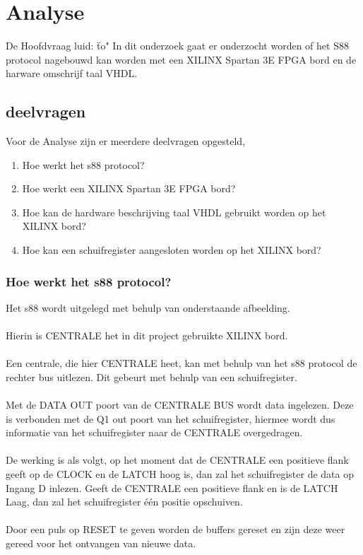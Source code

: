 \chapter{Analyse}
De Hoofdvraag luid:
\"to"
In dit onderzoek gaat er onderzocht worden of het S88 protocol nagebouwd kan worden met een XILINX Spartan 3E FPGA bord en de harware omschrijf taal VHDL.
\section{deelvragen}
Voor de Analyse zijn er meerdere deelvragen opgesteld,

\begin{enumerate}
	\item Hoe werkt het s88 protocol?
	\item Hoe werkt een XILINX Spartan 3E FPGA bord?
	\item Hoe kan de hardware beschrijving taal VHDL gebruikt worden op het XILINX bord?
	\item Hoe kan een schuifregister aangesloten worden op het XILINX bord?
\end{enumerate}

\subsection{Hoe werkt het s88 protocol?}
Het s88 wordt uitgelegd met behulp van onderstaande afbeelding.
\\\\
Hierin is CENTRALE het in dit project gebruikte XILINX bord. 
\\\\
Een centrale, die hier CENTRALE heet, kan met behulp van het s88 protocol de rechter bus uitlezen. Dit gebeurt met behulp van een schuifregister.
\\\\
Met de DATA OUT poort van de CENTRALE BUS wordt data ingelezen. Deze is verbonden met de Q1 out poort van het schuifregister, hiermee wordt dus informatie van het schuifregister naar de CENTRALE overgedragen.
\\\\
De werking is als volgt, op het moment dat de CENTRALE een positieve flank geeft op de CLOCK en de LATCH hoog is, dan zal het schuifregister de data op Ingang D inlezen. Geeft de CENTRALE een positieve flank en is de LATCH Laag, dan zal het schuifregister één positie opschuiven.
\\\\
Door een puls op RESET te geven worden de buffers gereset en zijn deze weer gereed voor het ontvangen van nieuwe data. 


